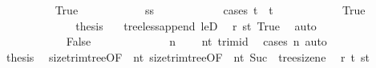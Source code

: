 \begin{isabellebody}
\ \ \ \ \ \ \ \ \isamarkupfalse%
\ True\isanewline
\ \ \ \ \ \ \ \ \isamarkupfalse%
\ \isamarkupfalse%
\ {\isachardoublequoteopen}ss\ {\isacharequal}{\kern0pt}\ {\isacharbrackleft}{\kern0pt}{\isacharbrackright}{\kern0pt}{\isachardoublequoteclose}\isanewline
\ \ \ \ \ \ \ \ \isamarkupfalse%
\ {\isacharparenleft}{\kern0pt}cases\ {\isachardoublequoteopen}t{}\ {\isacharequal}{\kern0pt}\ t{\isachardoublequoteclose}{\isacharparenright}{\kern0pt}\isanewline
\ \ \ \ \ \ \ \ \ \ \isamarkupfalse%
\ True\isanewline
\ \ \ \ \ \ \ \ \ \ \isamarkupfalse%
\ \isamarkupfalse%
\ {\isacharquery}{\kern0pt}thesis\ \isamarkupfalse%
\ {}{\isacharparenleft}{\kern0pt}{}{\isacharparenright}{\kern0pt}\ tree{\isacharunderscore}{\kern0pt}less{\isacharunderscore}{\kern0pt}append\ leD\ \isamarkupfalse%
\ r\ {\isacartoucheopen}s{\isacharequal}{\kern0pt}t{}{\isacartoucheclose}\ True\ \isamarkupfalse%
\ auto\isanewline
\ \ \ \ \ \ \ \ \isamarkupfalse%
\isanewline
\ \ \ \ \ \ \ \ \ \ \isamarkupfalse%
\ False\isanewline
\ \ \ \ \ \ \ \ \ \ \isamarkupfalse%
\ \isamarkupfalse%
\ {\isachardoublequoteopen}n{}\ {\isacharequal}{\kern0pt}\ {}{\isachardoublequoteclose}\ \isamarkupfalse%
\ nt{}\ trim{\isacharunderscore}{\kern0pt}id\ \isamarkupfalse%
\ {\isacharparenleft}{\kern0pt}cases\ n{}{\isacharparenright}{\kern0pt}\ auto\isanewline
\ \ \ \ \ \ \ \ \ \ \isamarkupfalse%
\ \isamarkupfalse%
\ {\isacharquery}{\kern0pt}thesis\ \isamarkupfalse%
\ size{\isacharunderscore}{\kern0pt}trim{\isacharunderscore}{\kern0pt}tree{\isacharbrackleft}{\kern0pt}OF\ {\isacharunderscore}{\kern0pt}\ nt{}{\isacharbrackright}{\kern0pt}\ size{\isacharunderscore}{\kern0pt}trim{\isacharunderscore}{\kern0pt}tree{\isacharbrackleft}{\kern0pt}OF\ {\isacharunderscore}{\kern0pt}\ nt{}{\isacharbrackright}{\kern0pt}\ Suc\ {}{\isacharparenleft}{\kern0pt}{}{\isacharparenright}{\kern0pt}\ tree{\isacharunderscore}{\kern0pt}size{\isacharunderscore}{\kern0pt}ne{\isacharunderscore}{\kern0pt}{}\ \isamarkupfalse%
\ r\ t{}\ {\isacartoucheopen}s{\isacharequal}{\kern0pt}t{}{\isacartoucheclose}\ \isamarkupfalse%

\end{isabellebody}
